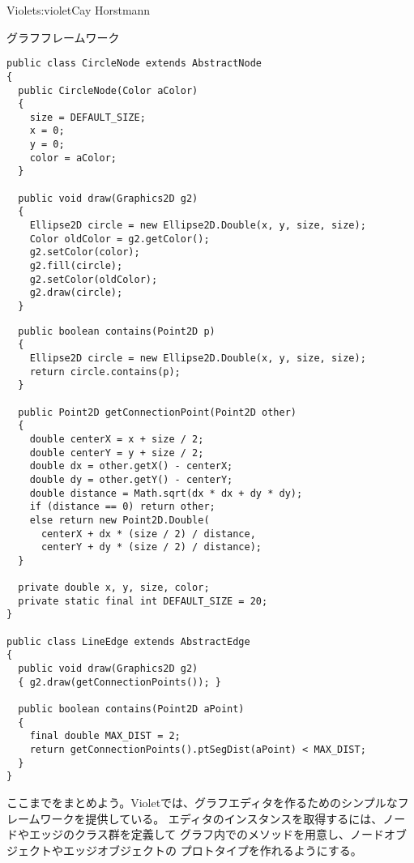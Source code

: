 \begin{aosachapter}{Violet}{s:violet}{Cay Horstmann}
\begin{aosasect1}{グラフフレームワーク}
\begin{verbatim}
public class CircleNode extends AbstractNode
{
  public CircleNode(Color aColor)
  {
    size = DEFAULT_SIZE;
    x = 0;
    y = 0;
    color = aColor;
  }

  public void draw(Graphics2D g2)
  {
    Ellipse2D circle = new Ellipse2D.Double(x, y, size, size);
    Color oldColor = g2.getColor();
    g2.setColor(color);
    g2.fill(circle);
    g2.setColor(oldColor);
    g2.draw(circle);
  }
\end{verbatim}

\begin{verbatim}
  public boolean contains(Point2D p)
  {
    Ellipse2D circle = new Ellipse2D.Double(x, y, size, size);
    return circle.contains(p);
  }

  public Point2D getConnectionPoint(Point2D other)
  {
    double centerX = x + size / 2;
    double centerY = y + size / 2;
    double dx = other.getX() - centerX;
    double dy = other.getY() - centerY;
    double distance = Math.sqrt(dx * dx + dy * dy);
    if (distance == 0) return other;
    else return new Point2D.Double(
      centerX + dx * (size / 2) / distance,
      centerY + dy * (size / 2) / distance);
  }

  private double x, y, size, color;
  private static final int DEFAULT_SIZE = 20;
}

public class LineEdge extends AbstractEdge
{
  public void draw(Graphics2D g2)
  { g2.draw(getConnectionPoints()); }

  public boolean contains(Point2D aPoint)
  {
    final double MAX_DIST = 2;
    return getConnectionPoints().ptSegDist(aPoint) < MAX_DIST;
  }
}
\end{verbatim}


ここまでをまとめよう。Violetでは、グラフエディタを作るためのシンプルなフレームワークを提供している。
エディタのインスタンスを取得するには、ノードやエッジのクラス群を定義して
グラフ内でのメソッドを用意し、ノードオブジェクトやエッジオブジェクトの
プロトタイプを作れるようにする。


\end{aosasect1}
\end{aosachapter}
